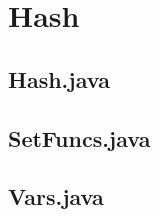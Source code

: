 \section{Hash}

\subsection{Hash.java}

\clearpage

\subsection{SetFuncs.java}
	
\clearpage

\subsection{Vars.java}
	
\clearpage
